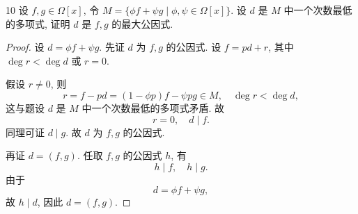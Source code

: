 \begin{ex}{10}\label{ex:1.4.10}
    设 \(f,g\in\Omega[x]\), 令 \(M=\{\phi f+\psi g\mid\phi,\psi\in\Omega[x]\}\).
    设 \(d\) 是 \(M\) 中一个次数最低的多项式, 证明 \(d\) 是 \(f,g\) 的最大公因式.
\end{ex}

\begin{proof}
    设 \(d=\phi f+\psi g\).
    先证 \(d\) 为 \(f,g\) 的公因式. 设 \(f=pd+r\), 其中 \(\deg r<\deg d\) 或 \(r=0\).
    
    假设 \(r\neq0\), 则
    \[
    r=f-pd=(1-\phi p)f-\psi pg\in M,\quad\deg r<\deg d,
    \]
    这与题设 \(d\) 是 \(M\) 中一个次数最低的多项式矛盾. 故
    \[
    r=0,\quad d\mid f.
    \]
    同理可证 \(d\mid g\). 故 \(d\) 为 \(f,g\) 的公因式.

    再证 \(d=(f,g)\). 任取 \(f,g\) 的公因式 \(h\), 有
    \[
    h\mid f,\quad h\mid g.
    \]
    由于
    \[
    d=\phi f+\psi g,
    \]
    故 \(h\mid d\), 因此 \(d=(f,g)\).
\end{proof}